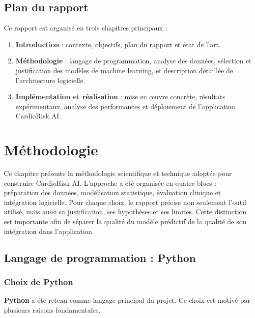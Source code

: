 \documentclass[12pt,a4paper]{report}
\begin{document}
\section{Plan du rapport}

Ce rapport est organisé en trois chapitres principaux :

\begin{enumerate}[leftmargin=1.5em]
 \item \textbf{Introduction} : contexte, objectifs, plan du rapport et état de l'art.
 \item \textbf{Méthodologie} : langage de programmation, analyse des données, sélection et justification des modèles de machine learning, et description détaillée de l'architecture logicielle.
 \item \textbf{Implémentation et réalisation} : mise en œuvre concrète, résultats expérimentaux, analyse des performances et déploiement de l'application CardioRisk AI.
\end{enumerate}

\chapter{Méthodologie}

Ce chapitre présente la méthodologie scientifique et technique adoptée pour construire
CardioRisk AI. L'approche a été organisée en quatre blocs : préparation des données,
modélisation statistique, évaluation clinique et intégration logicielle. Pour chaque choix,
le rapport précise non seulement l'outil utilisé, mais aussi sa justification, ses
hypothèses et ses limites. Cette distinction est importante afin de séparer la qualité du
modèle prédictif de la qualité de son intégration dans l'application.

\section{Langage de programmation : Python}

\subsection{Choix de Python}

\textbf{Python} a été retenu comme langage principal du projet. Ce choix est motivé par
plusieurs raisons fondamentales.
\end{document}
